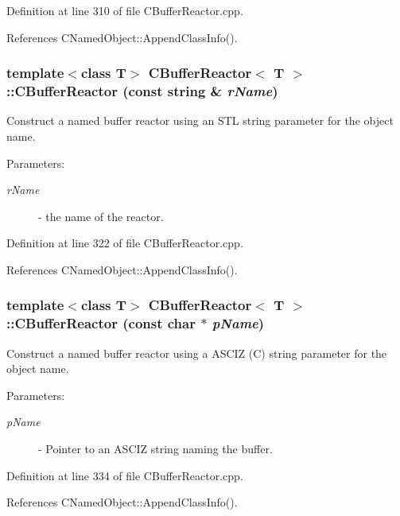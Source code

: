 Definition at line 310 of file CBuffer\-Reactor.cpp.

References CNamed\-Object::Append\-Class\-Info().
\subsubsection{\setlength{\rightskip}{0pt plus 5cm}template$<$class T$>$ CBuffer\-Reactor$<$ T $>$::CBuffer\-Reactor (const string \& {\em r\-Name})}\label{classCBufferReactor_a1}


Construct a named buffer reactor using an STL string parameter for the object name. \begin{Desc}
\item[Parameters: ]\par
\begin{description}
\item[{\em 
r\-Name}]- the name of the reactor. \end{description}
\end{Desc}


Definition at line 322 of file CBuffer\-Reactor.cpp.

References CNamed\-Object::Append\-Class\-Info().
\subsubsection{\setlength{\rightskip}{0pt plus 5cm}template$<$class T$>$ CBuffer\-Reactor$<$ T $>$::CBuffer\-Reactor (const char $\ast$ {\em p\-Name})}\label{classCBufferReactor_a2}


Construct a named buffer reactor using a ASCIZ (C) string parameter for the object name. \begin{Desc}
\item[Parameters: ]\par
\begin{description}
\item[{\em 
p\-Name}]- Pointer to an ASCIZ string naming the buffer. \end{description}
\end{Desc}


Definition at line 334 of file CBuffer\-Reactor.cpp.

References CNamed\-Object::Append\-Class\-Info().

